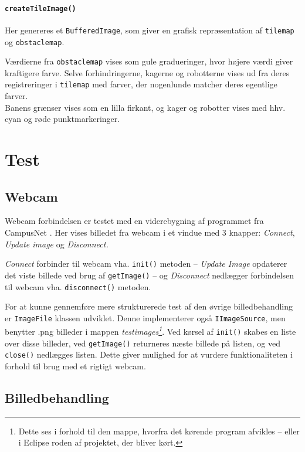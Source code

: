 \paragraph{\texttt{createTileImage()}}
Her genereres et \texttt{BufferedImage}, som giver en grafisk repræsentation af \texttt{tilemap} og \texttt{obstaclemap}.

Værdierne fra \texttt{obstaclemap} vises som gule gradueringer, hvor højere værdi giver kraftigere farve. Selve forhindringerne, kagerne og robotterne vises ud fra deres registreringer i \texttt{tilemap} med farver, der nogenlunde matcher deres egentlige farver.\\
Banens grænser vises som en lilla firkant, og kager og robotter vises med hhv. cyan og røde punktmarkeringer.
\begin{comment}
Webcam
	mode
	player?
	
Processor
	Thresholds
	Resolution
\end{comment}

\section{Test}
\subsection{Webcam}
Webcam forbindelsen er testet med en viderebygning af programmet fra CampusNet . Her vises billedet fra webcam i et vindue med 3 knapper: \textit{Connect}, \textit{Update image} og \textit{Disconnect.}

\textit{Connect} forbinder til webcam vha. \texttt{init()} metoden -- \textit{Update Image} opdaterer det viste billede ved brug af \texttt{getImage()} -- og \textit{Disconnect} nedlægger forbindelsen til webcam vha. \texttt{disconnect()} metoden.

For at kunne gennemføre mere strukturerede test af den øvrige billedbehandling er \texttt{ImageFile} klassen udviklet. Denne implementerer også \texttt{IImageSource}, men benytter .png billeder i mappen \textit{testimages\footnote{Dette ses i forhold til den mappe, hvorfra det kørende program afvikles -- eller i Eclipse roden af projektet, der bliver kørt.}}. Ved kørsel af \texttt{init()} skabes en liste over disse billeder, ved \texttt{getImage()} returneres næste billede på listen, og ved \texttt{close()} nedlægges listen. Dette giver mulighed for at vurdere funktionaliteten i forhold til brug med et rigtigt webcam.

\subsection{Billedbehandling}
